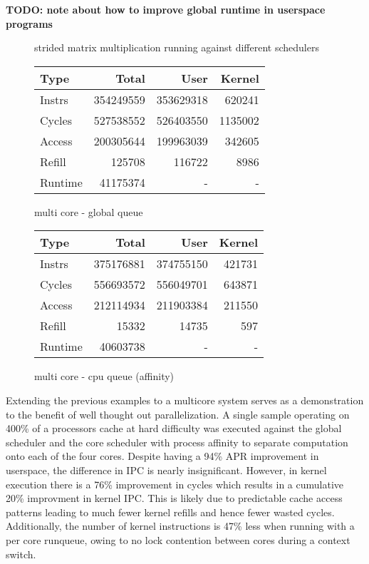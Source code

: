 \documentclass[11pt]{article}
\begin{document}
\textbf{TODO: note about how to improve global runtime in userspace programs}

\begin{figure*}[h]
	\caption{strided matrix multiplication running against different schedulers}		
	\centering
	\begin{subtable}{.48\linewidth}
		\centering
		\begin{tabular}{ l|rrr }
			Type    & Total     & User      & Kernel  \\
			\hline
			Instrs  & 354249559 & 353629318 & 620241  \\ 
			Cycles  & 527538552 & 526403550 & 1135002 \\ 
			Access  & 200305644 & 199963039 & 342605  \\ 
			Refill  & 125708    & 116722    & 8986    \\ 
			Runtime & 41175374  & -         & -       \\ 
			\hline
		\end{tabular}
		\caption{multi core - global queue}
	\end{subtable}
	\begin{subtable}{.48\linewidth} 
		\centering        
		\begin{tabular}{ l|rrr }
			Type    & Total     & User      & Kernel \\
			\hline
			Instrs  & 375176881 & 374755150 & 421731 \\ 
			Cycles  & 556693572 & 556049701 & 643871 \\ 
			Access  & 212114934 & 211903384 & 211550 \\ 
			Refill  & 15332     & 14735     & 597    \\ 
			Runtime & 40603738  & -         & -      \\ 
			\hline
		\end{tabular}
		\caption{multi core - cpu queue (affinity)}    
	\end{subtable}
\end{figure*}

Extending the previous examples to a multicore system serves as a demonstration to the benefit of well thought out parallelization.  A single sample operating on 400\% of a processors cache at hard difficulty was executed against the global scheduler and the core scheduler with process affinity to separate computation onto each of the four cores.  Despite having a 94\% APR improvement in userspace, the difference in IPC is nearly insignificant.  However, in kernel execution there is a 76\% improvement in cycles which results in a cumulative 20\% improvment in kernel IPC.  This is likely due to predictable cache access patterns leading to much fewer kernel refills and hence fewer wasted cycles.  Additionally, the number of kernel instructions is 47\% less when running with a per core runqueue, owing to no lock contention between cores during a context switch.
\end{document}
